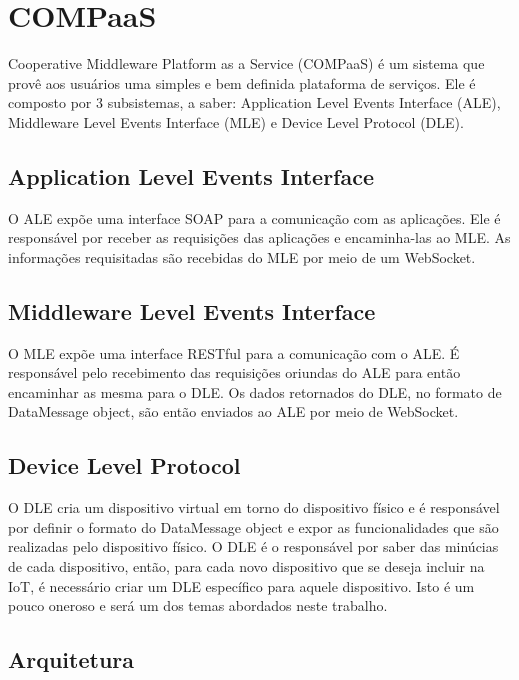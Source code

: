 \section{COMPaaS}
\label{sec:COMPaaS}
Cooperative Middleware Platform as a Service (COMPaaS) é um sistema que provê aos usuários uma simples e bem
definida plataforma de serviços. Ele é composto por 3 subsistemas, a saber:  Application Level Events
Interface (ALE), Middleware Level Events Interface (MLE) e Device Level Protocol (DLE).

\subsection{Application Level Events Interface}
O ALE expõe uma interface SOAP para a comunicação com as aplicações. Ele é responsável por receber as requisições
das aplicações e encaminha-las ao MLE. As informações requisitadas são recebidas do MLE por meio de um WebSocket.

\subsection{Middleware Level Events Interface}
O MLE expõe uma interface RESTful para a comunicação com o ALE. É responsável pelo recebimento das requisições
oriundas do ALE para então encaminhar as mesma para o DLE. Os dados retornados do DLE, no formato de DataMessage
object, são então enviados ao ALE por meio de WebSocket.

\subsection{Device Level Protocol}
O DLE cria um dispositivo virtual em torno do dispositivo físico e é responsável por definir o formato do DataMessage
object e expor as funcionalidades que são realizadas pelo dispositivo físico. O DLE é o responsável por saber das
minúcias de cada dispositivo, então, para cada novo dispositivo que se deseja incluir na IoT, é necessário criar
um DLE específico para aquele dispositivo. Isto é um pouco oneroso e será um dos temas abordados neste trabalho.

\subsection{Arquitetura}
